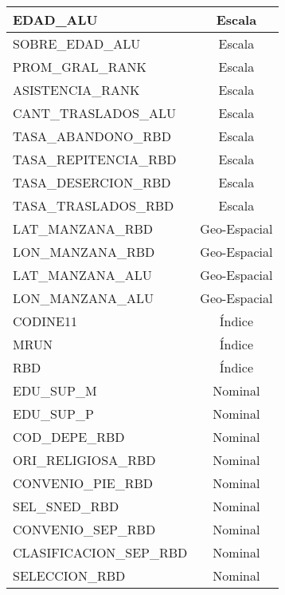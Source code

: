 \begin{longtable}{|l|c|}
EDAD\_ALU                             & Escala            \\ \hline
SOBRE\_EDAD\_ALU                      & Escala            \\ \hline
PROM\_GRAL\_RANK                      & Escala            \\ \hline
ASISTENCIA\_RANK                      & Escala            \\ \hline
CANT\_TRASLADOS\_ALU                  & Escala            \\ \hline
TASA\_ABANDONO\_RBD                   & Escala            \\ \hline
TASA\_REPITENCIA\_RBD                 & Escala            \\ \hline
TASA\_DESERCION\_RBD                  & Escala            \\ \hline
TASA\_TRASLADOS\_RBD                  & Escala            \\ \hline
LAT\_MANZANA\_RBD                     & Geo-Espacial      \\ \hline
LON\_MANZANA\_RBD                     & Geo-Espacial      \\ \hline
LAT\_MANZANA\_ALU                     & Geo-Espacial      \\ \hline
LON\_MANZANA\_ALU                     & Geo-Espacial      \\ \hline
CODINE11                              & Índice            \\ \hline
MRUN                                  & Índice            \\ \hline
RBD                                   & Índice            \\ \hline
EDU\_SUP\_M                           & Nominal           \\ \hline
EDU\_SUP\_P                           & Nominal           \\ \hline
COD\_DEPE\_RBD                        & Nominal           \\ \hline
ORI\_RELIGIOSA\_RBD                   & Nominal           \\ \hline
CONVENIO\_PIE\_RBD                    & Nominal           \\ \hline
SEL\_SNED\_RBD                        & Nominal           \\ \hline
CONVENIO\_SEP\_RBD                    & Nominal           \\ \hline
CLASIFICACION\_SEP\_RBD               & Nominal           \\ \hline
SELECCION\_RBD                        & Nominal           \\ \hline

\end{longtable}
